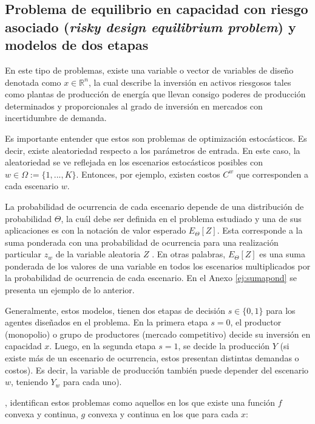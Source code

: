 \subsection{Problema de equilibrio en capacidad con riesgo asociado (\textit{risky design equilibrium problem}) y modelos de dos etapas}

En este tipo de problemas, existe una variable o vector de variables de diseño denotada como  $x \in \mathbb{R}^{n}$, la cual describe la inversión en activos riesgosos tales como plantas de producción de energía que llevan consigo poderes de producción determinados y proporcionales al grado de inversión en mercados con incertidumbre de demanda.
\vspace{2.5mm}

Es importante entender que estos son problemas de optimización estocásticos. Es decir, existe aleatoriedad respecto a los parámetros de entrada. En este caso, la aleatoriedad se ve reflejada en los escenarios estocásticos posibles con $w \in \Omega:=\{1,...,K\}$. Entonces, por ejemplo, existen costos $C^{w}$ que corresponden a cada escenario $w$. 
\vspace{2.5mm}

La probabilidad de ocurrencia de cada escenario depende de una distribución de probabilidad $\Theta$, la cuál debe ser definida en el problema estudiado y una de sus aplicaciones es con la notación de valor esperado $E_{\Theta}[Z]$. Esta corresponde a la suma ponderada con una probabilidad de ocurrencia para una realización particular $z_{w}$ de la variable aleatoria $Z$ . En otras palabras, $E_{\Theta}[Z]$ es una suma ponderada de los valores de una variable en todos los escenarios multiplicados por la probabilidad de ocurrencia de cada escenario. En el Anexo \ref{ej:sumapond} se presenta un ejemplo de lo anterior.
\vspace{2.5mm}

Generalmente, estos modelos, tienen dos etapas de decisión $s\in\{0,1\}$ para los agentes diseñados en el problema. En la primera etapa $s=0$, el productor (monopolio) o grupo de productores (mercado competitivo) decide su inversión en capacidad $x$. Luego, en la segunda etapa $s=1$, se decide la producción $Y$ (si existe más de un escenario de ocurrencia, estos presentan distintas demandas o costos). Es decir, la variable de producción también puede depender del escenario $w$, teniendo $Y_{w}$ para cada uno).
\vspace{2.5mm}

 , identifican estos problemas como aquellos en los que existe una función $f$ convexa y continua, $g$ convexa y continua en los que para cada $x$:

